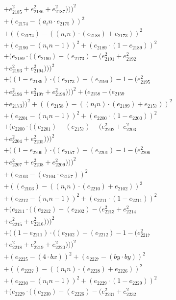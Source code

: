 \documentclass[10pt, a4paper]{article}
\begin{document}
\begin{small}
\begin{align*}
& + e_{2185}^{2} + e_{2186}^{2} + e_{2187}^{2})))^{2} \\
& + (e_{2174} - (a_in  \cdot  e_{2175}))^{2} \\
& + ((e_{2174}) - ((n_in)  \cdot  (e_{2188}) + e_{2173}))^{2} \\
& + (e_{2190} - (n_in - 1))^{2} + (e_{2189}  \cdot  (1 - e_{2189}))^{2} \\
& + (e_{2189}  \cdot  ((e_{2190}) - (e_{2173}) - (e_{2191}^{2} + e_{2192}^{2} \\
& + e_{2193}^{2} + e_{2194}^{2})))^{2} \\
& + ((1 - e_{2189})  \cdot  ((e_{2173}) - (e_{2190}) - 1 - (e_{2195}^{2} \\
& + e_{2196}^{2} + e_{2197}^{2} + e_{2198}^{2})))^{2} + (e_{2158} - (e_{2159} \\
& + e_{2173}))^{2} + ((e_{2158}) - ((n_in)  \cdot  (e_{2199}) + e_{2157}))^{2} \\
& + (e_{2201} - (n_in - 1))^{2} + (e_{2200}  \cdot  (1 - e_{2200}))^{2} \\
& + (e_{2200}  \cdot  ((e_{2201}) - (e_{2157}) - (e_{2202}^{2} + e_{2203}^{2} \\
& + e_{2204}^{2} + e_{2205}^{2})))^{2} \\
& + ((1 - e_{2200})  \cdot  ((e_{2157}) - (e_{2201}) - 1 - (e_{2206}^{2} \\
& + e_{2207}^{2} + e_{2208}^{2} + e_{2209}^{2})))^{2} \\
& + (e_{2103} - (e_{2104}  \cdot  e_{2157}))^{2} \\
& + ((e_{2103}) - ((n_in)  \cdot  (e_{2210}) + e_{2102}))^{2} \\
& + (e_{2212} - (n_in - 1))^{2} + (e_{2211}  \cdot  (1 - e_{2211}))^{2} \\
& + (e_{2211}  \cdot  ((e_{2212}) - (e_{2102}) - (e_{2213}^{2} + e_{2214}^{2} \\
& + e_{2215}^{2} + e_{2216}^{2})))^{2} \\
& + ((1 - e_{2211})  \cdot  ((e_{2102}) - (e_{2212}) - 1 - (e_{2217}^{2} \\
& + e_{2218}^{2} + e_{2219}^{2} + e_{2220}^{2})))^{2} \\
& + (e_{2225} - (4  \cdot  bx))^{2} + (e_{2227} - (by  \cdot  by))^{2} \\
& + ((e_{2227}) - ((n_in)  \cdot  (e_{2228}) + e_{2226}))^{2} \\
& + (e_{2230} - (n_in - 1))^{2} + (e_{2229}  \cdot  (1 - e_{2229}))^{2} \\
& + (e_{2229}  \cdot  ((e_{2230}) - (e_{2226}) - (e_{2231}^{2} + e_{2232}^{2} \\

\end{align*}
\end{small}
\end{document}
